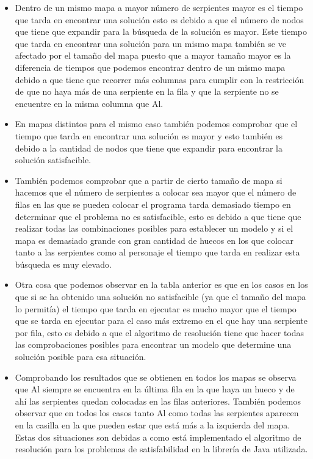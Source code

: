 \documentclass[11pt,spanish]{article}
\begin{document}
			\begin{itemize}
				\item Dentro de un mismo mapa a mayor número de serpientes mayor es el tiempo que tarda en encontrar una solución esto es debido a que el número de nodos que tiene que expandir para la búsqueda de la solución es mayor. Este tiempo que tarda en encontrar una solución para un mismo mapa también se ve afectado por el tamaño del mapa puesto que a mayor tamaño mayor es la diferencia de tiempos que podemos encontrar dentro de un mismo mapa debido a que tiene que recorrer más columnas para cumplir con la restricción de que no haya más de una serpiente en la fila y que la serpiente no se encuentre en la misma columna que Al.
				\item En mapas distintos para el mismo caso también podemos comprobar que el tiempo que tarda en encontrar una solución es mayor y esto también es debido a la cantidad de nodos que tiene que expandir para encontrar la solución satisfacible.
				\item También podemos comprobar que a partir de cierto tamaño de mapa si hacemos que el número de serpientes a colocar sea mayor que el número de filas en las que se pueden colocar el programa tarda demasiado tiempo en determinar que el problema no es satisfacible, esto es debido a que tiene que realizar todas las combinaciones posibles para establecer un modelo y si el mapa es demasiado grande con gran cantidad de huecos en los que colocar tanto a las serpientes como al personaje el tiempo que tarda en realizar esta búsqueda es muy elevado.
				\item Otra cosa que podemos observar en la tabla anterior es que en los casos en los que si se ha obtenido una solución no satisfacible (ya que el tamaño del mapa lo permitía) el tiempo que tarda en ejecutar es mucho mayor que el tiempo que se tarda en ejecutar para el caso más extremo en el que hay una serpiente por fila, esto es debido a que el algoritmo de resolución tiene que hacer todas las comprobaciones posibles para encontrar un modelo que determine una solución posible para esa situación.
				\item Comprobando los resultados que se obtienen en todos los mapas se observa que Al siempre se encuentra en la última fila en la que haya un hueco y de ahí las serpientes quedan colocadas en las filas anteriores. También podemos observar que en todos los casos tanto Al como todas las serpientes aparecen en la casilla en la que pueden estar que está más a la izquierda del mapa. Estas dos situaciones son debidas a como está implementado el algoritmo de resolución para los problemas de satisfabilidad en la librería de Java utilizada.
			\end{itemize}
\end{document}
